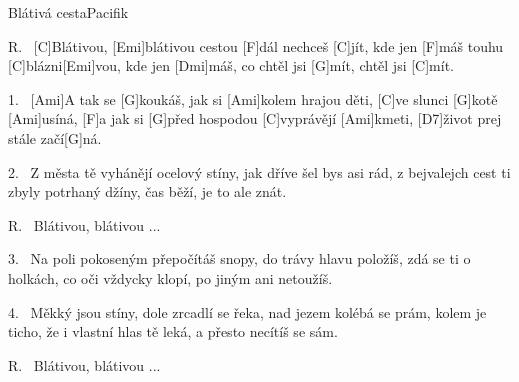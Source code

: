 \begin{song}{Blátivá cesta}{Pacifik}

\begin{xverse}{R.~}
[\large C]Blátivou, [\large Emi]blátivou cestou [\large F]dál nechceš [\large C]jít,
kde jen [\large F]máš touhu [\large C]blázni[\large Emi]vou,
kde jen [\large Dmi]máš, co chtěl jsi [\large G]mít, chtěl jsi [\large C]mít.
\end{xverse}

\begin{xverse}{1.~}
[\large Ami]A tak se [\large G]koukáš, jak si [\large Ami]kolem hrajou děti,
[\large C]ve slunci [\large G]kotě [\large Ami]usíná,
[\large F]a jak si [\large G]před hospodou [\large C]vyprávějí [\large Ami]kmeti,
[\large D7]{}život prej stále začí[\large G]ná.
\end{xverse}

\begin{xverse}{2.~}
Z města tě vyhánějí ocelový stíny,
jak dříve šel bys asi rád,
z bejvalejch cest ti zbyly potrhaný džíny,
čas běží, je to ale znát.
\end{xverse}

\begin{xverse}{R.~}
Blátivou, blátivou ...
\end{xverse}

\begin{xverse}{3.~}
Na poli pokoseným přepočítáš snopy,
do trávy hlavu položíš,
zdá se ti o holkách, co oči vždycky klopí,
po jiným ani netoužíš.
\end{xverse}

\begin{xverse}{4.~}
Měkký jsou stíny, dole zrcadlí se řeka,
nad jezem kolébá se prám,
kolem je ticho, že i vlastní hlas tě leká,
a přesto necítíš se sám.
\end{xverse}

\begin{xverse}{R.~}
Blátivou, blátivou ...
\end{xverse}

\end{song}

